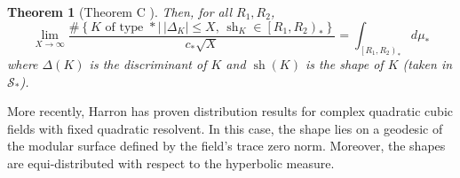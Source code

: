 \documentclass[table]{amsart}
\newtheorem{theorem}{Theorem}[section]
\numberwithin{equation}{section}
\begin{document}
\begin{theorem}[Theorem C \cite{Har17}] Then, for all $R_{1}, R_{2}$,
$$
\lim _{X \rightarrow \infty} \frac{\#\left\{K \text { of type }\ast\mid \,|\Delta_K| \leq X,\,\operatorname{sh}_K \in\left[R_{1}, R_{2}\right)_\ast\right\}}{c_{\ast} \sqrt{X}}=\int_{\left[R_{1}, R_{2}\right)_\ast} d \mu_{\ast}
$$
where $\Delta(K)$ is the discriminant of $K$ and $\operatorname{sh}(K)$ is the shape of $K$ (taken in $\mathscr{S}_{\ast}$).
\end{theorem}
\par More recently, Harron \cite{HarronANT} has proven distribution results for complex quadratic cubic fields with fixed quadratic resolvent. In this case, the shape lies on a geodesic of the modular surface defined by the field's trace zero norm. Moreover, the shapes are equi-distributed with respect to the hyperbolic measure.
\end{document}
